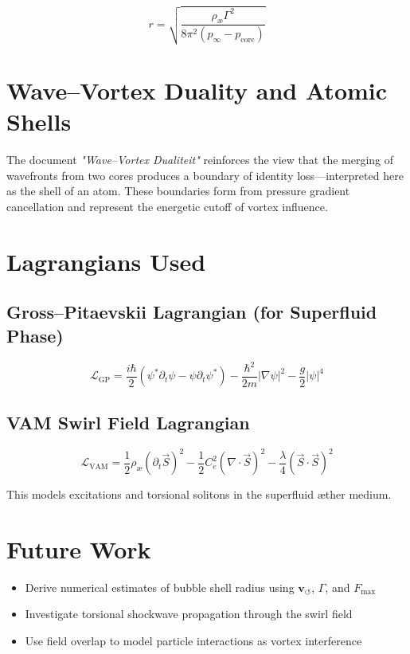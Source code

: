 \documentclass[12pt]{article}
\begin{document}
\[
r = \sqrt{ \frac{\rho_\text{\ae} \Gamma^2}{8\pi^2 (p_\infty - p_\text{core})} }
\]

\section{Wave–Vortex Duality and Atomic Shells}
The document \textit{"Wave–Vortex Dualiteit"} reinforces the view that the merging of wavefronts from two cores produces a boundary of identity loss—interpreted here as the shell of an atom. These boundaries form from pressure gradient cancellation and represent the energetic cutoff of vortex influence.

\section{Lagrangians Used}

\subsection{Gross–Pitaevskii Lagrangian (for Superfluid Phase)}
\[
\mathcal{L}_\text{GP} = \frac{i\hbar}{2} \left( \psi^* \partial_t \psi - \psi \partial_t \psi^* \right)
- \frac{\hbar^2}{2m} |\nabla \psi|^2 - \frac{g}{2} |\psi|^4
\]

\subsection{VAM Swirl Field Lagrangian}
\[
\mathcal{L}_\text{VAM} = \frac{1}{2} \rho_\text{\ae} \left( \partial_t \vec{S} \right)^2
- \frac{1}{2} C_e^2 \left( \nabla \cdot \vec{S} \right)^2
- \frac{\lambda}{4} (\vec{S} \cdot \vec{S})^2
\]

This models excitations and torsional solitons in the superfluid \ae ther medium.

\section{Future Work}
\begin{itemize}
\item Derive numerical estimates of bubble shell radius using \( \mathbf{v}_{\scriptscriptstyle\boldsymbol{\circlearrowleft}} \), \( \Gamma \), and \( F_{\text{max}} \)
\item Investigate torsional shockwave propagation through the swirl field
\item Use field overlap to model particle interactions as vortex interference
\end{itemize}
\end{document}
